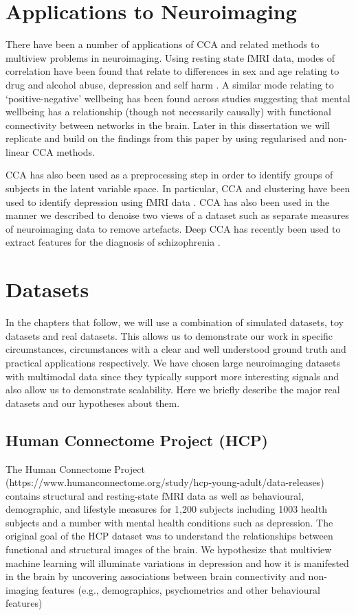 \section{Applications to Neuroimaging}

There have been a number of applications of CCA and related methods to multiview problems in neuroimaging. Using resting state fMRI data, modes of correlation have been found that relate to differences in sex and age relating to drug and alcohol abuse, depression and self harm \cite{mihalik2019brain}. A similar mode relating to `positive-negative' wellbeing has been found across studies \cite{smith2015positive} suggesting that mental wellbeing has a relationship (though not necessarily causally) with functional connectivity between networks in the brain. Later in this dissertation we will replicate and build on the findings from this paper by using regularised and non-linear CCA methods. 

CCA has also been used as a preprocessing step in order to identify groups of subjects in the latent variable space. In particular, CCA and clustering have been used to identify depression using fMRI data \cite{dinga2019evaluating} \cite{drysdale2017resting}. CCA has also been used in the manner we described to denoise two views of a dataset such as separate measures of neuroimaging data \cite{zhuang2020technical} to remove artefacts. Deep CCA has recently been used to extract features for the diagnosis of schizophrenia \cite{qi2016deep}. 


\section{Datasets}

In the chapters that follow, we will use a combination of simulated datasets, toy datasets and real datasets. This allows us to demonstrate our work in specific circumstances, circumstances with a clear and well understood ground truth and practical applications respectively. We have chosen large neuroimaging datasets with multimodal data since they typically support more interesting signals and also allow us to demonstrate scalability. Here we briefly describe the major real datasets and our hypotheses about them.

\subsection{Human Connectome Project (HCP)}

The Human Connectome Project (https://www.humanconnectome.org/study/hcp-young-adult/data-releases) contains structural and resting-state fMRI data as well as behavioural, demographic, and lifestyle measures for 1,200 subjects including 1003 health subjects and a number with mental health conditions such as depression. The original goal of the HCP dataset was to understand the relationships between functional and structural images of the brain. We hypothesize that multiview machine learning will illuminate variations in depression and how it is manifested in the brain by uncovering associations between brain connectivity and non-imaging features (e.g., demographics, psychometrics and other behavioural features)

